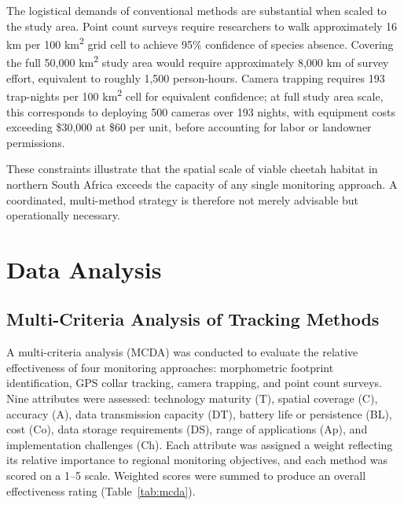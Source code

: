 \documentclass[12pt, letterpaper]{article}
\begin{document}
The logistical demands of conventional methods are substantial when scaled to the study area.
Point count surveys require researchers to walk approximately 16 km per 100
km\textsuperscript{2} grid cell to achieve 95\% confidence of species absence. Covering the
full 50,000 km\textsuperscript{2} study area would require approximately 8,000 km of survey
effort, equivalent to roughly 1,500 person-hours. Camera trapping requires 193 trap-nights per
100 km\textsuperscript{2} cell for equivalent confidence; at full study area scale, this
corresponds to deploying 500 cameras over 193 nights, with equipment costs exceeding
\$30,000 at \$60 per unit, before accounting for labor or landowner permissions.

These constraints illustrate that the spatial scale of viable cheetah habitat in northern South
Africa exceeds the capacity of any single monitoring approach. A coordinated, multi-method
strategy is therefore not merely advisable but operationally necessary.

\section{Data Analysis}

\subsection{Multi-Criteria Analysis of Tracking Methods}

A multi-criteria analysis (MCDA) was conducted to evaluate the relative effectiveness of four
monitoring approaches: morphometric footprint identification, GPS collar tracking, camera
trapping, and point count surveys. Nine attributes were assessed: technology maturity (T),
spatial coverage (C), accuracy (A), data transmission capacity (DT), battery life or persistence
(BL), cost (Co), data storage requirements (DS), range of applications (Ap), and
implementation challenges (Ch). Each attribute was assigned a weight reflecting its relative
importance to regional monitoring objectives, and each method was scored on a 1--5 scale.
Weighted scores were summed to produce an overall effectiveness rating (Table~\ref{tab:mcda}).

\vspace{6pt}
\end{document}
